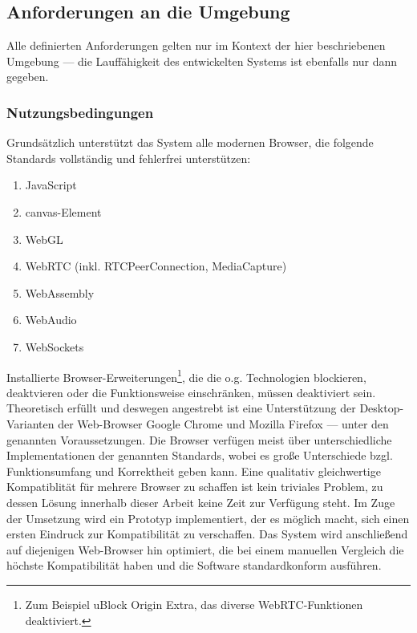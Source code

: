\subsection{Anforderungen an die
Umgebung}\label{anforderungen-an-die-umgebung}

Alle definierten Anforderungen gelten nur im Kontext der hier
beschriebenen Umgebung --- die Lauffähigkeit des entwickelten Systems
ist ebenfalls nur dann gegeben.

\subsubsection{Nutzungsbedingungen}\label{nutzungsbedingungen}

Grundsätzlich unterstützt das System alle modernen Browser, die folgende
Standards vollständig und fehlerfrei unterstützen:

\begin{enumerate}
\def\labelenumi{\arabic{enumi}.}
\tightlist
\item
  JavaScript
\item
  \gls{canvas}-Element
\item
  WebGL
\item
  WebRTC (inkl. RTCPeerConnection, MediaCapture)
\item
  WebAssembly
\item
  WebAudio
\item
  WebSockets
\end{enumerate}


Installierte
Browser-Erweiterungen\footnote{Zum Beispiel \glqq{}uBlock Origin Extra\grqq{}, das diverse WebRTC-Funktionen deaktiviert.},
die die o.g. Technologien blockieren, deaktvieren oder die
Funktionsweise einschränken, müssen deaktiviert sein. Theoretisch
erfüllt und deswegen angestrebt ist eine Unterstützung der
Desktop-Varianten der Web-Browser Google Chrome und Mozilla Firefox
--- unter den genannten Voraussetzungen. Die Browser verfügen meist über
unterschiedliche Implementationen der genannten Standards, wobei es
große Unterschiede bzgl. Funktionsumfang und Korrektheit geben kann.
Eine qualitativ gleichwertige Kompatiblität für mehrere Browser zu
schaffen ist kein triviales Problem, zu dessen Lösung innerhalb dieser
Arbeit keine Zeit zur Verfügung steht. Im Zuge der Umsetzung wird ein
Prototyp implementiert, der es möglich macht, sich einen ersten Eindruck
zur Kompatibilität zu verschaffen. Das System wird anschließend auf
diejenigen Web-Browser hin optimiert, die bei einem manuellen Vergleich
die höchste Kompatibilität haben und die Software standardkonform
ausführen.

